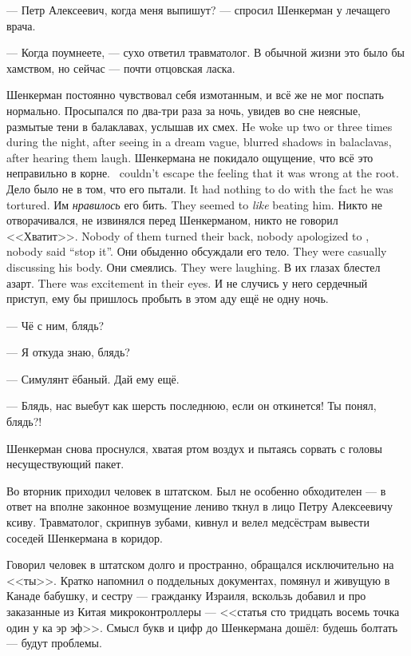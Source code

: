 --- Петр Алексеевич, когда меня выпишут? --- спросил Шенкерман у лечащего врача.

--- Когда поумнеете, --- сухо ответил травматолог.
В обычной жизни это было бы хамством, но сейчас --- почти отцовская ласка.

Шенкерман постоянно чувствовал себя измотанным, и всё же не мог поспать нормально.
{Просыпался по два-три раза за ночь, увидев во сне неясные, размытые тени в балаклавах, услышав их смех.}
{He woke up two or three times during the night, after seeing in a dream vague, blurred shadows in balaclavas, after hearing them laugh.}
{Шенкермана не покидало ощущение, что всё это неправильно в корне.}
{\Shenkerman\ couldn't escape the feeling that it was wrong at the root.}
{Дело было не в том, что его пытали.}
{It had nothing to do with the fact he was tortured.}
{Им \emph{нравилось} его бить.}
{They seemed to \emph{like} beating him.}
{Никто не отворачивался, не извинялся перед Шенкерманом, никто не говорил <<Хватит>>.}
{Nobody of them turned their back, nobody apologized to \Shenkerman, nobody said ``stop it''.}
{Они обыденно обсуждали его тело.}
{They were casually discussing his body.}
{Они смеялись.}
{They were laughing.}
{В их глазах блестел азарт.}
{There was excitement in their eyes.}
И не случись у него сердечный приступ, ему бы пришлось пробыть в этом аду ещё не одну ночь.

--- Чё с ним, блядь?

--- Я откуда знаю, блядь?

--- Симулянт ёбаный.
Дай ему ещё.

--- Блядь, нас выебут как шерсть последнюю, если он откинется!
Ты понял, блядь?!

Шенкерман снова проснулся, хватая ртом воздух и пытаясь сорвать с головы несуществующий пакет.

Во вторник приходил человек в штатском.
Был не особенно обходителен --- в ответ на вполне законное возмущение лениво ткнул в лицо Петру Алексеевичу ксиву.
Травматолог, скрипнув зубами, кивнул и велел медсёстрам вывести соседей Шенкермана в коридор.

Говорил человек в штатском долго и пространно, обращался исключительно на <<ты>>.
Кратко напомнил о поддельных документах, помянул и живущую в Канаде бабушку, и сестру --- гражданку Израиля, вскользь добавил и про заказанные из Китая микроконтроллеры --- <<статья сто тридцать восемь точка один у ка эр эф>>.
Смысл букв и цифр до Шенкермана дошёл: будешь болтать --- будут проблемы.

